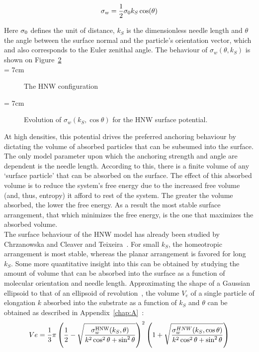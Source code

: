 \begin{equation}
        \sigma_w = \frac{1}{2}\sigma_0 k_S\cos(\theta)
	\label{eqn:sigma_w_HNW}
\end{equation}

Here $\sigma_0$ defines the unit of distance, $k_S$ is the dimensionless needle length and 
$\theta$ the angle 
between the surface normal and the particle's orientation vector, which and also corresponds 
to the Euler zenithal angle.  The behaviour of $\sigma_w(\theta,k_S)$ is shown on 
Figure~\ref{fig:sw_HNW}\\

\picW = 7cm
\begin{figure}
	\centering
	\caption{The HNW configuration}
	\label{fig:HGO_wal}
\end{figure}

\picW = 7cm
\begin{figure}
	\centering
	\caption{Evolution of $\sigma_w(k_S, \cos\theta)$ for the HNW surface potential.}
	\label{fig:sw_HNW}
\end{figure}

At high densities, this potential drives the preferred
anchoring behaviour by dictating the volume of absorbed particles that can be subsumed 
into the surface. The only model parameter upon which the anchoring strength and 
angle are dependent is the needle length. According to this, there is a finite volume of 
any `surface particle' that can be absorbed on the surface. The effect of this absorbed 
volume is to reduce the system's free energy due to the increased free volume (and, thus,
entropy) it afford to rest of the system.
The greater the volume  absorbed, the lower the free energy. As a result the most stable
surface arrangement, \ie that which minimizes the free energy, is the one that maximizes 
the absorbed volume.\\

The surface behaviour of the HNW model has already been studied by Chrza\-now\-ska 
\etal\cite{Chrzanowska_Teixera_01} and Cleaver and Teixeira~\cite{Cleaver_Teixeira_01}. For
small $k_S$, the homeotropic arrangement is most stable, whereas the planar arrangement is 
favored for long $k_S$. Some more quantitative insight into this can be obtained by studying the
amount of volume that can be absorbed into the surface as a function of molecular orientation 
and needle length. Approximating the shape of a Gaussian ellipsoid to that of an ellipsoid of
revolution~\cite{Rigby89}, the volume $V_e$ of a single particle of elongation $k$ absorbed into 
the substrate as a function of $k_S$ and $\theta$ can be obtained as described in
Appendix~\ref{chap:A}~:
\begin{equation}
	Ve=\frac{1}{3}\pi
	\left( \frac{1}{2}-\sqrt{\frac{\sigma^{\mathrm{HNW}}_w(k_S,\theta)}{k^2\cos^2\theta+\sin^2\theta}}\right)^2 
	\left( 1 + \sqrt{\frac{\sigma^{HNW}_w(k_S,\cos\theta)}{k^2\cos^2\theta+\sin^2\theta}} \right)
	\label{eqn:Ve_HNW}
\end{equation}

